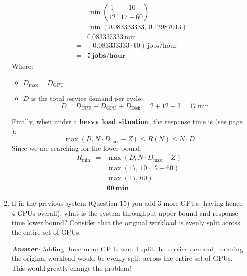 \begin{enumerate}
\begin{equation*}
\begin{array}{rcl}
            &=& \min\left(\dfrac{1}{12},\, \dfrac{10}{17 + 60}\right) \\ [1.5em]
            &=& \min\left(0.083333333,\, 0.12987013\right) \\ [.5em]
            &=& 0.083333333\, \text{min} \\ [.5em]
            &=& \left(0.083333333 \cdot 60\right) \, \text{jobs/hour} \\ [.5em]
            &=& \mathbf{5} \, \textbf{jobs/hour}
        \end{array}
    \end{equation*}
    Where:
    \begin{itemize}
        \item $D_{\max} = D_{\text{GPU}}$
        \item $D$ is the total service demand per cycle:
        \begin{equation*}
            D = D_{\text{CPU}} + D_{\text{GPU}} + D_{\text{Disk}} = 2 + 12 + 3 = 17 \, \text{min}
        \end{equation*}
    \end{itemize}
    Finally, when under a \textbf{heavy load situation}, the response time is (see page \pageref{eq: response time - heavy load}):
    \begin{equation*}
        \max\left(D, N \cdot D_{\max} - Z\right) \le R\left(N\right) \le N \cdot D
    \end{equation*}
    Since we are searching for the lower bound:
    \begin{equation*}
        \begin{array}{rcl}
            R_{\min} &=& \max\left(D, N \cdot D_{\max} - Z\right) \\ [.5em]
            &=& \max\left(17, \, 10 \cdot 12 - 60\right) \\ [.5em]
            &=& \max\left(17, \, 60\right) \\ [.5em]
            &=& \mathbf{60} \, \textbf{min}
        \end{array}
    \end{equation*}

    \item If in the previous system (Question 15) you add 3 more GPUs (having hence 4 GPUs overall), what is the system throughput upper bound and response time lower bound? Consider that the original workload is evenly split across the entire set of GPUs.
    
    \textcolor{Green3}{\textbf{\emph{Answer:}}} Adding three more GPUs would split the service demand, meaning the original workload would be evenly split across the entire set of GPUs. This would greatly change the problem!


\end{enumerate}

